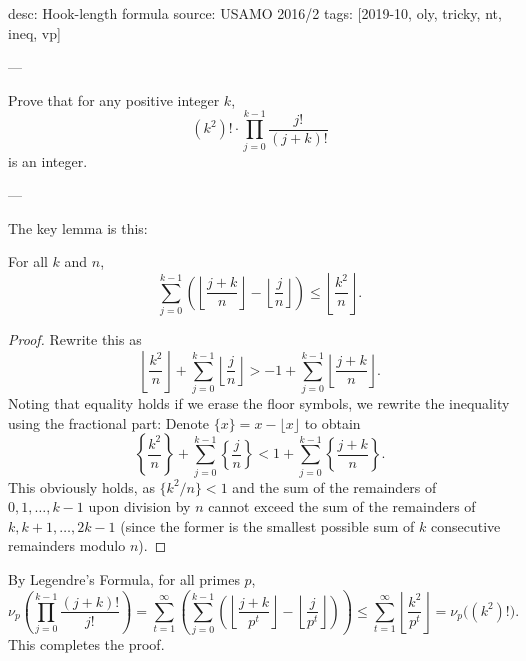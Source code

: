 desc: Hook-length formula
source: USAMO 2016/2
tags: [2019-10, oly, tricky, nt, ineq, vp]

---

Prove that for any positive integer $k$, \[(k^2)!\cdot\prod_{j=0}^{k-1}\frac{j!}{(j+k)!}\]
is an integer.

---

The key lemma is this:
\begin{lemma*}
    For all $k$ and $n$, \[\sum_{j=0}^{k-1}\left(\left\lfloor\frac{j+k}n\right\rfloor-\left\lfloor\frac jn\right\rfloor\right)\le\left\lfloor\frac{k^2}n\right\rfloor.\]
\end{lemma*}
\begin{proof}
    Rewrite this as \[\left\lfloor\frac{k^2}n\right\rfloor+\sum_{j=0}^{k-1}\left\lfloor\frac jn\right\rfloor>-1+\sum_{j=0}^{k-1}\left\lfloor\frac{j+k}n\right\rfloor.\]
    Noting that equality holds if we erase the floor symbols, we rewrite the inequality using the fractional part: Denote $\{x\}=x-\lfloor x\rfloor$ to obtain \[\left\{\frac{k^2}n\right\}+\sum_{j=0}^{k-1}\left\{\frac jn\right\}<1+\sum_{j=0}^{k-1}\left\{\frac{j+k}n\right\}.\]
This obviously holds, as $\{k^2/n\}<1$ and the sum of the remainders of $0,1,\ldots,k-1$ upon division by $n$ cannot exceed the sum of the remainders of $k,k+1,\ldots,2k-1$ (since the former is the smallest possible sum of $k$ consecutive remainders modulo $n$).
\end{proof}

By Legendre's Formula, for all primes $p$, \[\nu_p\left(\prod_{j=0}^{k-1}\frac{(j+k)!}{j!}\right)=\sum_{t=1}^\infty\left(\sum_{j=0}^{k-1}\left(\left\lfloor\frac{j+k}{p^t}\right\rfloor-\left\lfloor\frac j{p^t}\right\rfloor\right)\right)\le\sum_{t=1}^\infty\left\lfloor\frac{k^2}{p^t}\right\rfloor=\nu_p\Big((k^2)!\Big).\]
This completes the proof.
